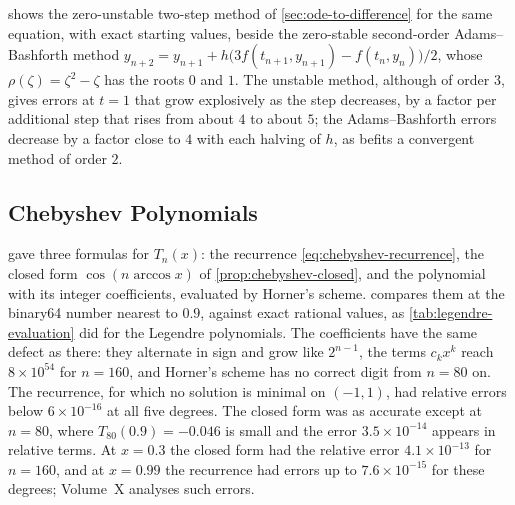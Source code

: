 shows the zero-unstable two-step method of \cref{sec:ode-to-difference} for the same equation, with exact starting values, beside the zero-stable second-order Adams--Bashforth method $y_{n+2}=y_{n+1}+h\bigl(3f(t_{n+1},y_{n+1})-f(t_n,y_n)\bigr)/2$, whose $\rho(\zeta)=\zeta^2-\zeta$ has the roots $0$ and $1$. The unstable method, although of order $3$, gives errors at $t=1$ that grow explosively as the step decreases, by a factor per additional step that rises from about $4$ to about $5$; the Adams--Bashforth errors decrease by a factor close to $4$ with each halving of $h$, as befits a convergent method of order $2$.

\begin{table}
\end{table}

\subsection{Chebyshev Polynomials}

 gave three formulas for $T_n(x)$: the recurrence \eqref{eq:chebyshev-recurrence}, the closed form $\cos(n\arccos x)$ of \cref{prop:chebyshev-closed}, and the polynomial with its integer coefficients, evaluated by Horner's scheme.  compares them at the binary64 number nearest to $0.9$, against exact rational values, as \cref{tab:legendre-evaluation} did for the Legendre polynomials. The coefficients have the same defect as there: they alternate in sign and grow like $2^{n-1}$, the terms $c_kx^k$ reach $8\times10^{54}$ for $n=160$, and Horner's scheme has no correct digit from $n=80$ on. The recurrence, for which no solution is minimal on $(-1,1)$, had relative errors below $6\times10^{-16}$ at all five degrees. The closed form was as accurate except at $n=80$, where $T_{80}(0.9)=-0.046$ is small and the error $3.5\times10^{-14}$ appears in relative terms. At $x=0.3$ the closed form had the relative error $4.1\times10^{-13}$ for $n=160$, and at $x=0.99$ the recurrence had errors up to $7.6\times10^{-15}$ for these degrees; Volume~X analyses such errors.

